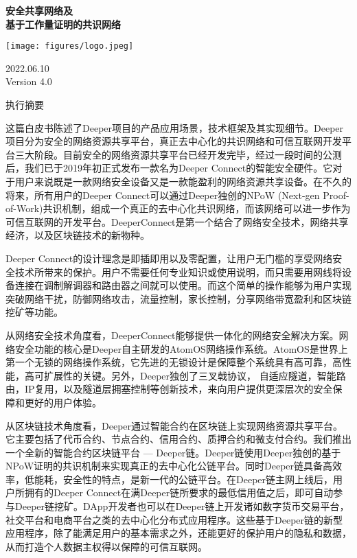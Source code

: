 \documentclass[a4paper]{article}
\begin{document}
\begin{titlepage}
	\begin{center}
		\vspace*{1cm}

		\Huge
		\textbf{安全共享网络及\\基于工作量证明的共识网络}

		\vspace{2cm}

		\texttt{[image: figures/logo.jpeg]}

		\normalsize
		2022.06.10 \\ Version 4.0
	\end{center}
\end{titlepage}

\centerline{执行摘要}
这篇白皮书陈述了Deeper项目的产品应用场景，技术框架及其实现细节。Deeper项目分为安全的网络资源共享平台，真正去中心化的共识网络和可信互联网开发平台三大阶段。目前安全的网络资源共享平台已经开发完毕，经过一段时间的公测后，我们已于2019年初正式发布一款名为Deeper Connect的智能安全硬件。它对于用户来说既是一款网络安全设备又是一款能盈利的网络资源共享设备。在不久的将来，所有用户的Deeper Connect可以通过Deeper独创的NPoW (Next-gen Proof-of-Work)共识机制，组成一个真正的去中心化共识网络，而该网络可以进一步作为可信互联网的开发平台。DeeperConnect是第一个结合了网络安全技术，网络共享经济，以及区块链技术的新物种。

Deeper Connect的设计理念是即插即用以及零配置，让用户无门槛的享受网络安全技术所带来的保护。用户不需要任何专业知识或使用说明，而只需要用网线将设备连接在调制解调器和路由器之间就可以使用。而这个简单的操作能够为用户实现突破网络干扰，防御网络攻击，流量控制，家长控制，分享网络带宽盈利和区块链挖矿等功能。

从网络安全技术角度看，DeeperConnect能够提供一体化的网络安全解决方案。网络安全功能的核心是Deeper自主研发的AtomOS网络操作系统。AtomOS是世界上第一个无锁的网络操作系统，它先进的无锁设计是保障整个系统具有高可靠，高性能，高可扩展性的关键。另外，Deeper独创了三叉戟协议， 自适应隧道，智能路由，IP复用，以及隧道层拥塞控制等创新技术，来向用户提供更深层次的安全保障和更好的用户体验。

从区块链技术角度看，Deeper通过智能合约在区块链上实现网络资源共享平台。它主要包括了代币合约、节点合约、信用合约、质押合约和微支付合约。我们推出一个全新的智能合约区块链平台 --- Deeper链。Deeper链使用Deeper独创的基于NPoW证明的共识机制来实现真正的去中心化公链平台。同时Deeper链具备高效率，低能耗，安全性的特点，是新一代的公链平台。在Deeper链主网上线后，用户所拥有的Deeper Connect在满Deeper链所要求的最低信用值之后，即可自动参与Deeper链挖矿。DApp开发者也可以在Deeper链上开发诸如数字货币交易平台，社交平台和电商平台之类的去中心化分布式应用程序。这些基于Deeper链的新型应用程序，除了能满足用户的基本需求之外，还能更好的保护用户的隐私和数据，从而打造个人数据主权得以保障的可信互联网。
\end{document}
